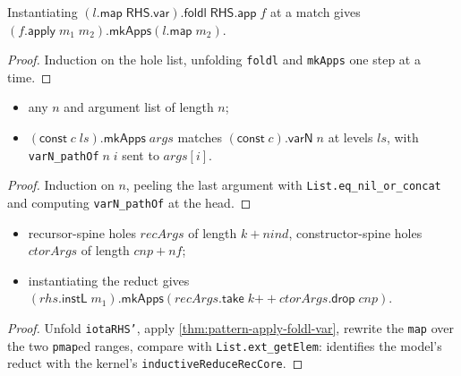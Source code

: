 \begin{lemma}
\label{thm:pattern-apply-foldl-var}
\leanok
{} 

 Instantiating $(l.\mathsf{map}\;\mathsf{RHS.var}).\mathsf{foldl}\;\mathsf{RHS.app}\;f$
at a match gives $(f.\mathsf{apply}\;m_1\;m_2).\mathsf{mkApps}(l.\mathsf{map}\;m_2)$.
\end{lemma}
\begin{proof}
\leanok
{} Induction on the hole list, unfolding \texttt{foldl} and \texttt{mkApps} one
step at a time.
\end{proof}

\begin{theorem}
\label{thm:pattern-matches-varn-const}
\leanok
{} 
\begin{itemize}
\item {} any $n$ and argument list of length $n$;
\item {} $(\mathsf{const}\;c\;ls).\mathsf{mkApps}\;args$ matches
$(\mathsf{const}\;c).\mathsf{varN}\;n$ at levels $ls$, with \texttt{varN\_pathOf}$\;n\;i$
sent to $args[i]$.
\end{itemize}
\end{theorem}
\begin{proof}
\leanok
{} Induction on $n$, peeling the last argument with
\texttt{List.eq\_nil\_or\_concat} and computing \texttt{varN\_pathOf} at the head.
\end{proof}

\begin{theorem}
\label{thm:pattern-iota-rhs-apply}
\leanok
{} 
\begin{itemize}
\item {} recursor-spine holes $recArgs$ of length $k+nind$, constructor-spine
holes $ctorArgs$ of length $cnp+nf$;
\item {} instantiating the reduct gives
$(rhs.\mathsf{instL}\;m_1).\mathsf{mkApps}(recArgs.\mathsf{take}\;k \mathbin{+\!\!+} ctorArgs.\mathsf{drop}\;cnp)$.
\end{itemize}
\end{theorem}
\begin{proof}
\leanok
{} Unfold \texttt{iotaRHS'}, apply \ref{thm:pattern-apply-foldl-var}, rewrite the
\texttt{map} over the two \texttt{pmap}ed ranges, compare with \texttt{List.ext\_getElem}:
identifies the model's reduct with the kernel's \texttt{inductiveReduceRecCore}.
\end{proof}

